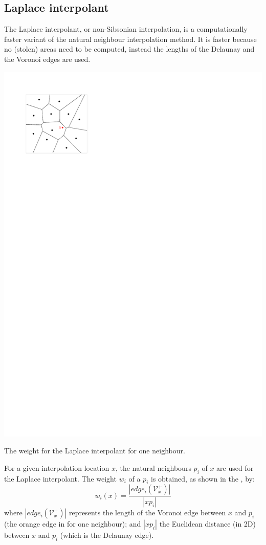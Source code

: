 \subsection{Laplace interpolant}
\label{sec:laplace}

The Laplace interpolant, or non-Sibsonian interpolation, is a computationally faster variant of the natural neighbour interpolation method.
It is faster because no (stolen) areas need to be computed, instead the lengths of the Delaunay and the Voronoi edges are used.

%
\begin{marginfigure}
  \centering
  \includegraphics[width=\textwidth,page=3]{figs/laplace.pdf}%
  \caption{The weight for the Laplace interpolant for one neighbour.}%
\end{marginfigure}
For a given interpolation location $x$, the natural neighbours $p_i$ of $x$ are used for the Laplace interpolant.
The weight $w_i$ of a $p_i$ is obtained, as shown in the , by:
\begin{equation}
  w_{i}(x) = \frac{|edge_i(\mathcal{V}^{+}_{x})|}{|xp_i|}
  \label{eq:laplace}
\end{equation}
where $|edge_i(\mathcal{V}^{+}_{x})|$ represents the length of the Voronoi edge between $x$ and $p_i$ (the orange edge in  for one neighbour); 
and $|xp_i|$ the Euclidean distance (in 2D) between $x$ and $p_i$ (which is the Delaunay edge).


